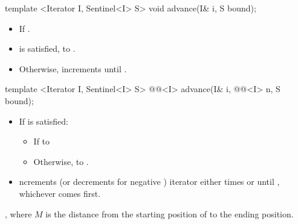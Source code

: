 \begin{addedblock}
\begin{itemdecl}
template <Iterator I, Sentinel<I> S>
  void advance(I& i, S bound);
\end{itemdecl}

\begin{itemdescr}
\pnum
\requires
{}

\pnum
\effects
\begin{itemize}
\item If .

\item {} is satisfied,  to .

\item Otherwise, increments  until .
\end{itemize}
\end{itemdescr}

\begin{itemdecl}
template <Iterator I, Sentinel<I> S>
  @@<I> advance(I& i, @@<I> n, S bound);
\end{itemdecl}

\begin{itemdescr}
\pnum
\requires
{}

\pnum
\effects
\begin{itemize}
\item If  is satisfied:
      \begin{itemize}
      \item If \brk{} to 

      \item Otherwise,  to .
      \end{itemize}

\item {}ncrements (or decrements for negative )
      iterator  either  times or until ,
      whichever comes first.
\end{itemize}

\pnum
\returns
{}, where $M$ is the distance from the starting position of
 to the ending position.
\end{itemdescr}
\end{addedblock}


